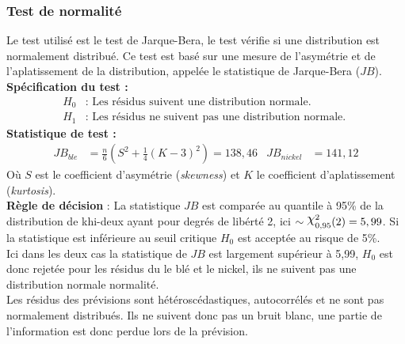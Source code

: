 \subsubsection*{Test de normalité}
Le test utilisé est le test de Jarque-Bera, le test vérifie si une distribution est normalement distribué. Ce test est basé sur une mesure de l'asymétrie et de l'aplatissement de la distribution, appelée le statistique de Jarque-Bera ($JB$).\\
\textbf{Spécification du test :} 
    \begin{align*}
        H_{0} &: \text{ Les résidus suivent une distribution normale.} \\
        H_{1} &: \text{ Les résidus ne suivent pas une distribution normale. }
    \end{align*}
\textbf{Statistique de test :} 
\begin{align*}
    JB_{ble} &= \frac{n}{6} \left( S^2 + \frac14 (K-3)^2 \right) = 138,46 & JB_{nickel} &= 141,12
\end{align*}
Où $S$ est le coefficient d'asymétrie (\textit{skewness}) et $K$ le coefficient d'aplatissement (\textit{kurtosis}).\\
\textbf{Règle de décision} : La statistique $JB$ est comparée au quantile à 95\% de la distribution de khi-deux ayant pour degrés de libérté 2, ici $\sim \rchi^{2}_{0,95}
(2) = 5,99$. Si la statistique est inférieure au seuil critique $H_{0}$ est acceptée au risque de 5\%.\\
Ici dans les deux cas la statistique de $JB$ est largement supérieur à 5,99, $H_{0}$ est donc rejetée pour les résidus du le blé et le nickel, ils ne suivent pas 
une distribution normale normalité.\\[11pt]
Les résidus des prévisions sont hétéroscédastiques, autocorrélés et ne sont pas normalement distribués. Ils ne suivent donc pas un bruit blanc, une partie de 
l'information est donc perdue lors de la prévision.